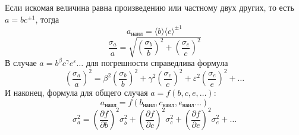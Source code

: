 Если искомая величина равна произведению или частному двух других, то есть $a = b c^{\pm 1}$, тогда
\begin{equation}
a_\text{наил} = \langle b \rangle \langle c \rangle^{\pm 1}
\end{equation}
\begin{equation}
\frac{\sigma_a}{a} = \sqrt{\left(\frac{\sigma_b}{b}\right)^2 + \left(\frac{\sigma_c}{c}\right)^2}
\end{equation}
В случае $a = b^\beta c^\gamma e^\varepsilon\!\!\ldots$ для погрешности справедлива формула
\begin{equation}
\left(\frac{\sigma_a}{a}\right)^2 = \beta^2 \left(\frac{\sigma_b}{b}\right)^2 + \gamma^2 \left(\frac{\sigma_c}{c}\right)^2 + \varepsilon^2 \left(\frac{\sigma_e}{e}\right)^2 + \ldots
\end{equation}
И наконец, формула для общего случая $a = f(b, c, e, \ldots)$:
\begin{equation}
a_\text{наил} = f(b_\text{наил}, c_\text{наил}, e_\text{наил} \ldots)
\end{equation}
\begin{equation}
\sigma_a^2 = \left(\frac{\partial f}{\partial b}\right)^2 \sigma_b^2 + \left(\frac{\partial f}{\partial c}\right)^2 \sigma_c^2 +\left(\frac{\partial f}{\partial e}\right)^2 \sigma_e^2 + \ldots
\end{equation}
